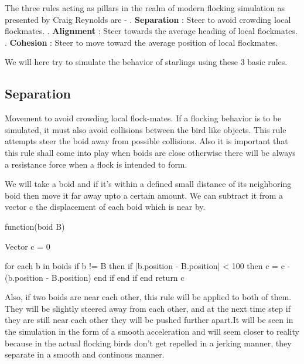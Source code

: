\documentclass[12pt]{article}
\begin{document}
The three rules acting as pillars in the realm of modern flocking simulation as presented by Craig Reynolds are - 
\newline
{}. \textbf{Separation} : Steer to avoid crowding local flockmates.
. \textbf{Alignment} : Steer towards the average heading of local flockmates.
. \textbf{Cohesion} : Steer to move toward the average position of local flockmates.

We will here try to simulate the behavior of starlings using these 3 basic rules. 

\subsection{Separation}
Movement to avoid crowding local flock-mates. If a flocking behavior is to be simulated, it must also avoid collisions between the bird like objects. This rule attempts steer the boid away from possible collisions. Also it is important that this rule shall come into play when boids are close otherwise there will be always a resistance force when a flock is intended to form.
\newline

We will take a boid and if it's within a defined small distance of its neighboring boid then move it far away upto a certain amount. We can subtract it from a vector c the displacement of each boid which is near by.\newline
	
    function(boid B){\newline
		Vector c = 0\newline

		for each b in boids\newline
			if b != B then\newline
				if |b.position - B.position| < 100 then\newline
					c = c - (b.position - B.position)\newline
				end if\newline
			end if\newline
		end\newline
		return c\newline
	}\newline

Also, if two boids are near each other, this rule will be applied to both of them. They will be slightly steered away from each other, and at the next time step if they are still near each other they will be pushed further apart.It will be seen in the simulation in the form of a smooth acceleration and will seem closer to reality because in the actual flocking birds don't get repelled in a jerking manner, they separate in a smooth and continous manner.
\end{document}
